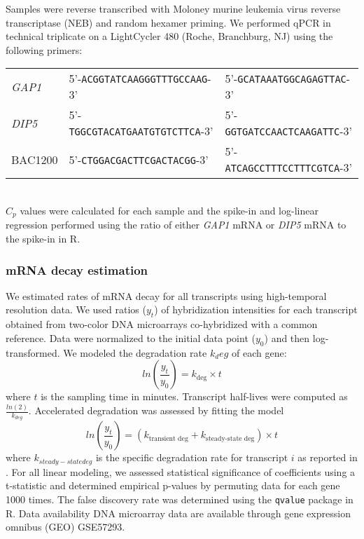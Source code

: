 Samples were reverse
transcribed with Moloney murine leukemia virus reverse transcriptase
(NEB) and random hexamer priming. We performed qPCR in technical
triplicate on a LightCycler 480 (Roche, Branchburg, NJ) using the
following primers: \\[1em]
\begin{tabular}{l | p{15em} p{15em}}
  \textit{GAP1} & 5'-\texttt{ACGGTATCAAGGGTTTGCCAAG}-3' &
    5'-\texttt{GCATAAATGGCAGAGTTAC}-3' \\
  \textit{DIP5} & 5'-\texttt{TGGCGTACATGAATGTGTCTTCA}-3' &
    5'-\texttt{GGTGATCCAACTCAAGATTC}-3' \\
  BAC1200 & 5'-\texttt{CTGGACGACTTCGACTACGG}-3' & 
    5'-\texttt{ATCAGCCTTTCCTTTCGTCA}-3' \\
\end{tabular} \\[1em]
$C_p$ values
were calculated for each sample and the spike-in and log-linear
regression performed using the ratio of either \textit{GAP1} mRNA or \textit{DIP5} mRNA
to the spike-in in R.  

\subsubsection{mRNA decay estimation}

We estimated rates of
mRNA decay for all transcripts using high-temporal resolution data. We
used ratios ($y_t$) of hybridization intensities for each transcript
obtained from two-color DNA microarrays co-hybridized with a common
reference. Data were normalized to the initial data point ($y_0$) and
then log-transformed. We modeled the degradation rate $k_deg$ of each
gene:
$$ ln\left(\frac{y_t}{y_0}\right)=k_{\text{deg}}\times t$$
where $t$ is the sampling time in minutes. Transcript
half-lives were computed as $\frac{ln(2)}{k_{deg}}$. 
Accelerated degradation was
assessed by fitting the model 
$$ ln\left(\frac{y_t}{y_0}\right)=(k_{\text{transient
deg}}+k_{\text{steady-state deg}})\times t$$
where $k_{steady-state deg}$ 
is the specific degradation rate for transcript $i$ as reported in 
\cite{neymotin2014determination}.
For all linear modeling, we assessed statistical
significance of coefficients using a t-statistic and determined
empirical p-values by permuting data for each gene 1000 times. The
false discovery rate was determined using the \texttt{qvalue} package in R.
Data availability DNA microarray data are available through gene
expression omnibus (GEO) GSE57293.

